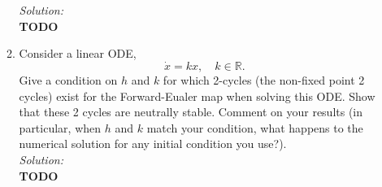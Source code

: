 \documentclass[10pt]{amsart}
\theoremstyle{nonumberplain}
\begin{document}
\begin{enumerate}[label={\bf {\arabic*}:}]
\begin{enumerate}
\textit{Solution:} \\
\textbf{TODO} \\

\item Consider a linear ODE, 
\begin{equation}
\dot x = kx, \quad k \in \mathbb R.
\label{eq:eq4}
\end{equation}
Give a condition on $h$ and $k$ for which 2-cycles (the non-fixed point 2 cycles) exist for the Forward-Eualer map when solving this ODE.
Show that these 2 cycles are neutrally stable.
Comment on your results (in particular, when $h$ and $k$ match your condition, what happens to the numerical solution for any initial condition you use?). \\

\textit{Solution:} \\
\textbf{TODO} \\

\end{enumerate}
\end{enumerate}
\end{document}
